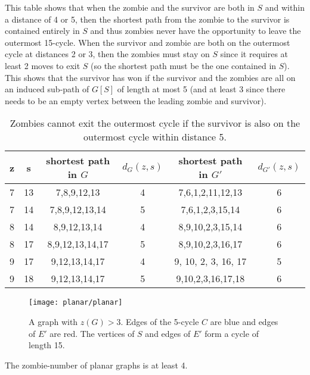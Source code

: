 This table shows that when the zombie and the survivor are both in $S$ and within a distance of 4 or 5, then the shortest path from the zombie to the survivor is contained entirely in $S$ and thus zombies never have the opportunity to leave the outermost 15-cycle.
When the survivor and zombie are both on the outermost cycle at distances 2 or 3, then the zombies must stay on $S$ since it requires at least 2 moves to exit $S$ (so the shortest path must be the one contained in $S$). This shows that the survivor has won if the survivor and the zombies are all on an induced sub-path of $G[S]$ of length at most 5 (and at least 3 since there needs to be an empty vertex between the leading zombie and survivor).

\begin{table}
\centering
\begin{tabular}{c | c | c | c | c | c}
z & s & shortest path in $G$ & $d_{G}(z,s)$ & shortest path in $G'$ & $d_{G'}(z,s)$  \\
\hline
7 & 13 & 7,8,9,12,13 & 4 & 7,6,1,2,11,12,13 & 6 \\
7 & 14 & 7,8,9,12,13,14 & 5 & 7,6,1,2,3,15,14 & 6 \\
8 & 14 & 8,9,12,13,14 & 4 & 8,9,10,2,3,15,14 & 6 \\
8 & 17 & 8,9,12,13,14,17 & 5 & 8,9,10,2,3,16,17 & 6 \\
9 & 17 & 9,12,13,14,17 & 4 & 9, 10, 2, 3, 16, 17 & 5 \\
9 & 18 & 9,12,13,14,17 & 5 & 9,10,2,3,16,17,18 & 6 \\
\end{tabular}
\caption{Zombies cannot exit the outermost cycle if the survivor is also on the outermost cycle within distance 5.\label{table outermost cycle}}
\end{table}

\begin{figure}
\centering
\texttt{[image: planar/planar]}
\caption{A graph with $z(G) > 3$. Edges of the 5-cycle $C$ are blue and edges of $E'$ are red. The vertices of $S$ and edges of $E'$ form a cycle of length 15. \label{fig:planar}}
\end{figure}

\begin{theorem}
  The zombie-number of planar graphs is at least 4. \label{thm planar zombies}
\end{theorem}

